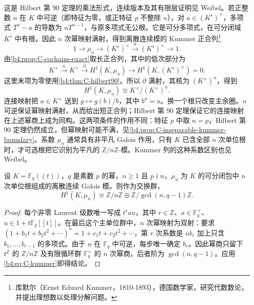 这是 Hilbert 第 90 定理的乘法形式，连续版本及其有限层证明见 Weibel\cite[Hilbert's Theorem 90 6.11.16, pp. 213--214]{Weibel1994HomologicalAlgebra}。若正整数 \(n\) 在 \(K\) 中可逆（即特征为零，或正特征 \(p\) 不整除 \(n\)），对 \(a\in(K^s)^\times\)，多项式 \(T^n-a\) 的导数为 \(nT^{n-1}\)，与原多项式无公根。它是可分多项式，在可分闭域 \(K^s\) 中有根。因此 \(n\) 次幂映射满射，得到离散连续模的 Kummer 正合列\footnote{库默尔（Ernst Eduard Kummer，1810-1893），德国数学家，研究代数数论，并提出理想数以处理分解问题。}
\[
	1\longrightarrow\mu_n\longrightarrow(K^s)^\times \xrightarrow{\;n\;}(K^s)^\times\longrightarrow1.
\]
由\cref{b4:prop:C-cochains-exact}取长正合列，其中的低次部分为
\[
	K^\times\xrightarrow{\;n\;}K^\times \xrightarrow{\partial}H^1(K,\mu_n) \longrightarrow H^1(K,(K^s)^\times)=0.
\]
这里末项为零使用\cref{b4:thm:C-hilbert90}。所以 \(\partial\) 满射，其核为 \((K^\times)^n\)，得到
\begin{equation}\label{b4:eq:C-kummer}
	H^1(K,\mu_n)\cong K^\times/(K^\times)^n.
\end{equation}
连接映射把 \(a\in K^\times\) 送到 \(g\mapsto g(b)/b\)，其中 \(b^n=a\)。换一个根只改变主余圈。\(n\) 可逆保证幂映射满射，从而给出短正合列；Hilbert 第 90 定理保证它的连接映射在上述幂商上成为同构。这两项条件的作用不同：特征 \(p\) 中取 \(n=p\)，Hilbert 第 90 定理仍然成立，但幂映射可能不满，见\cref{b4:prop:C-inseparable-kummer-boundary}。系数 \(\mu_n\) 通常具有非平凡 Galois 作用，只有 \(K\) 已含全部 \(n\) 次单位根时，才可选根把它识别为平凡的 \(\mathbb Z/n\mathbb Z\)-模。Kummer 列的这种系数区别也见 Weibel\cite[Chapter III, Sketch 6.10 and Example 6.10.1, pp. 241--242]{Weibel2013KBook}。

\begin{proposition}\label{b4:prop:C-kummer-local}
	设 \(K=\mathbb F_q(\!(t)\!)\)，\(q\) 是素数 \(p\) 的幂，\(n\ge1\) 且 \(p\nmid n\)，\(\mu_n\) 为 \(K\) 的可分闭包中 \(n\) 次单位根组成的离散连续 Galois 模。则作为交换群，
	\[
		H^1(K,\mu_n)\cong \mathbb Z/n\mathbb Z\oplus\mathbb Z/\gcd(n,q-1)\mathbb Z.
	\]
\end{proposition}
\begin{proof}
	每个非零 Laurent 级数唯一写成 \(t^r a u\)，其中 \(r\in\mathbb Z\)、\(a\in\mathbb F_q^\times\)、\(u\in1+t\mathbb F_q[\![t]\!]\)。在最后这个主单位群中，\(n\) 次幂映射为双射：要求 \((1+b_1t+b_2t^2+\cdots)^n=1+c_1t+c_2t^2+\cdots\)，第 \(r\) 次系数是 \(nb_r\) 加上只含 \(b_1,\ldots,b_{r-1}\) 的多项式。由于 \(n\) 在 \(\mathbb F_q\) 中可逆，每步唯一确定 \(b_r\)。因此幂商只留下 \(t^\mathbb Z\) 的 \(\mathbb Z/n\mathbb Z\) 及有限循环群 \(\mathbb F_q^\times\) 的 \(n\) 次幂商，后者阶为 \(\gcd(n,q-1)\)。应用\eqref{b4:eq:C-kummer}即得结论。
\end{proof}

